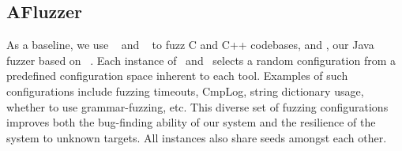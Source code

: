 \subsection{AFluzzer}
\label{afluzzer}

As a baseline, we use \afl~\cite{aflplusplus} and \libfuzzer~\cite{libfuzzer} to fuzz C and C++ codebases, and \jazzmine{}, our Java fuzzer based on \jazzer~\cite{jazzer}.
Each instance of \afl\ and \jazzmine\ selects a random configuration from a predefined configuration space inherent to each tool.
Examples of such configurations include fuzzing timeouts, CmpLog\cite{aschermann2019redqueen}, string dictionary usage, whether to use grammar-fuzzing, etc.
This diverse set of fuzzing configurations improves both the bug-finding ability of our system and the resilience of the system to unknown targets.
All instances also share seeds amongst each other.